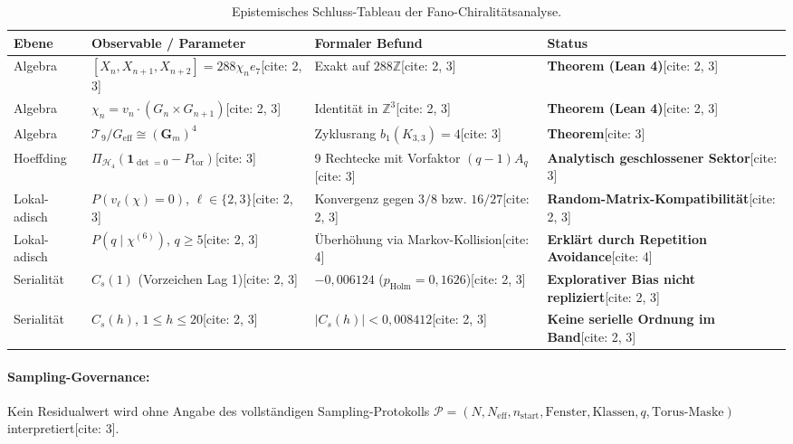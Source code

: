 \documentclass[11pt,a4paper]{article}
\theoremstyle{definition}
\theoremstyle{remark}
\begin{document}
\begin{table}[htbp]
\centering
\small
\begin{tabular}{llll}
\toprule
\textbf{Ebene} & \textbf{Observable / Parameter} & \textbf{Formaler Befund} & \textbf{Status} \\
\midrule
Algebra & $[X_n, X_{n+1}, X_{n+2}] = 288\chi_n e_7$[cite: 2, 3] & Exakt auf $288\mathbb{Z}$[cite: 2, 3] & \textbf{Theorem (Lean 4)}[cite: 2, 3] \\
Algebra & $\chi_n = v_n \cdot (G_n \times G_{n+1})$[cite: 2, 3] & Identität in $\mathbb{Z}^3$[cite: 2, 3] & \textbf{Theorem (Lean 4)}[cite: 2, 3] \\
Algebra & $\mathcal{T}_9 / G_{\mathrm{eff}} \cong (\mathbf{G}_m)^4$ & Zyklusrang $b_1(K_{3,3}) = 4$[cite: 3] & \textbf{Theorem}[cite: 3] \\
Hoeffding & $\Pi_{\mathcal{H}_4}(\mathbf{1}_{\det=0} - P_{\mathrm{tor}})$[cite: 3] & 9 Rechtecke mit Vorfaktor $(q-1)A_q$[cite: 3] & \textbf{Analytisch geschlossener Sektor}[cite: 3] \\
Lokal-adisch & $P(v_\ell(\chi)=0)$, $\ell \in \{2,3\}$[cite: 2, 3] & Konvergenz gegen $3/8$ bzw. $16/27$[cite: 2, 3] & \textbf{Random-Matrix-Kompatibilität}[cite: 2, 3] \\
Lokal-adisch & $P(q \mid \chi^{(6)})$, $q \ge 5$[cite: 2, 3] & Überhöhung via Markov-Kollision[cite: 4] & \textbf{Erklärt durch Repetition Avoidance}[cite: 4] \\
Serialität & $C_s(1)$ (Vorzeichen Lag 1)[cite: 2, 3] & $-0{,}006124$ ($p_{\mathrm{Holm}} = 0{,}1626$)[cite: 2, 3] & \textbf{Explorativer Bias nicht repliziert}[cite: 2, 3] \\
Serialität & $C_s(h)$, $1 \le h \le 20$[cite: 2, 3] & $|C_s(h)| < 0{,}008412$[cite: 2, 3] & \textbf{Keine serielle Ordnung im Band}[cite: 2, 3] \\
\bottomrule
\end{tabular}
\caption{Epistemisches Schluss-Tableau der Fano-Chiralitätsanalyse.}
\end{table}

\paragraph{Sampling-Governance:} Kein Residualwert wird ohne Angabe des vollständigen Sampling-Protokolls $\mathcal{P} = (N, N_{\mathrm{eff}}, n_{\mathrm{start}}, \text{Fenster}, \text{Klassen}, q, \text{Torus-Maske})$ interpretiert[cite: 3].
\end{document}
